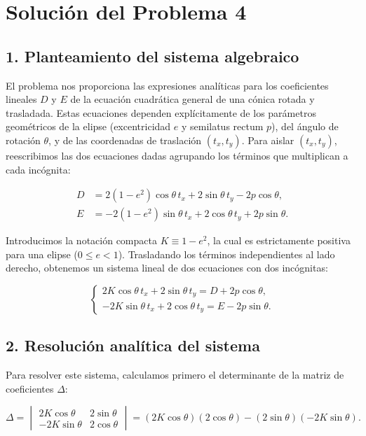 \documentclass[12pt, a4paper]{article}
\begin{document}
\section*{Solución del Problema 4}

\subsection*{1. Planteamiento del sistema algebraico}
El problema nos proporciona las expresiones analíticas para los coeficientes lineales $D$ y $E$ de la ecuación cuadrática general de una cónica rotada y trasladada. Estas ecuaciones dependen explícitamente de los parámetros geométricos de la elipse (excentricidad $e$ y semilatus rectum $p$), del ángulo de rotación $\theta$, y de las coordenadas de traslación $(t_x, t_y)$. Para aislar $(t_x, t_y)$, reescribimos las dos ecuaciones dadas agrupando los términos que multiplican a cada incógnita:

$$
\begin{aligned}
D &= 2(1-e^2)\cos\theta \, t_x + 2\sin\theta \, t_y - 2p\cos\theta, \\
E &= -2(1-e^2)\sin\theta \, t_x + 2\cos\theta \, t_y + 2p\sin\theta.
\end{aligned}
$$

Introducimos la notación compacta $K \equiv 1-e^2$, la cual es estrictamente positiva para una elipse ($0 \leq e < 1$). Trasladando los términos independientes al lado derecho, obtenemos un sistema lineal de dos ecuaciones con dos incógnitas:

$$
\begin{cases}
2K\cos\theta \, t_x + 2\sin\theta \, t_y = D + 2p\cos\theta, \\
-2K\sin\theta \, t_x + 2\cos\theta \, t_y = E - 2p\sin\theta.
\end{cases}
$$

\subsection*{2. Resolución analítica del sistema}
Para resolver este sistema, calculamos primero el determinante de la matriz de coeficientes $\Delta$:

$$
\Delta = \begin{vmatrix} 2K\cos\theta & 2\sin\theta \\ -2K\sin\theta & 2\cos\theta \end{vmatrix} = (2K\cos\theta)(2\cos\theta) - (2\sin\theta)(-2K\sin\theta).
$$
\end{document}
